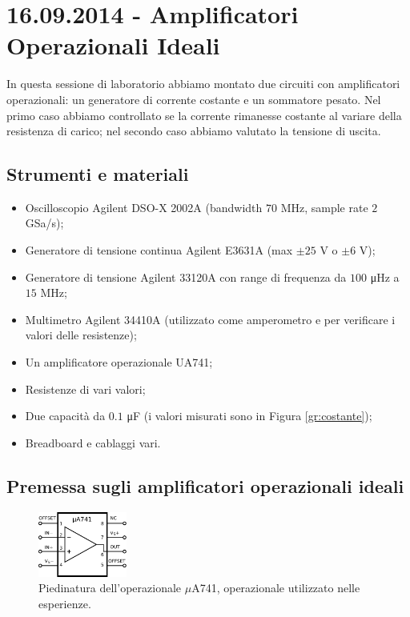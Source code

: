\section{16.09.2014 - Amplificatori Operazionali Ideali}

In questa sessione di laboratorio abbiamo montato due circuiti con amplificatori operazionali: un generatore di corrente costante e un sommatore pesato. Nel primo caso abbiamo controllato se la corrente rimanesse costante al variare della resistenza di carico; nel secondo caso abbiamo valutato la tensione di uscita.

\subsection*{Strumenti e materiali}

\begin{itemize} [noitemsep]
\item Oscilloscopio Agilent DSO-X 2002A (bandwidth $70$ \si{\mega\hertz}, sample rate $2$ GSa/s);
\item Generatore di tensione continua Agilent E3631A (max $\pm 25$ \si{\volt} o $\pm 6$ \si{\volt});
\item Generatore di tensione Agilent 33120A con range di frequenza da $100$ \si{\micro\hertz} a $15$ \si{\mega\hertz};
\item Multimetro Agilent 34410A (utilizzato come amperometro e per verificare i valori delle resistenze);
\item Un amplificatore operazionale UA741;
\item Resistenze di vari valori;
\item Due capacità da $0.1$ \si{\micro\farad} (i valori misurati sono in Figura \ref{gr:costante});
\item Breadboard e cablaggi vari.
\end{itemize}

\subsection{Premessa sugli amplificatori operazionali ideali}

\begin{figure}
  \begin{center}
    \includegraphics[width=0.260\textwidth]{../E01/latex/UA741.pdf}
  \end{center}
  \caption{Piedinatura dell'operazionale $\mu$A741, operazionale utilizzato nelle esperienze.}
  \label{cir4:open_collector}
\end{figure}

